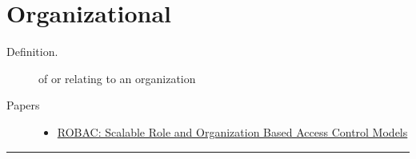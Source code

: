 \documentclass[letterpaper,10pt,english]{sphinxmanual}
\begin{document}
\chapter{Organizational}
\label{categories/organizational:organizational}\label{categories/organizational::doc}\begin{description}
\item[{Definition.}] \leavevmode
of or relating to an organization

\item[{Papers}] \leavevmode\begin{itemize}
\item {} 
\href{http://ieeexplore.ieee.org/xpls/abs\_all.jsp?arnumber=4207551}{ROBAC: Scalable Role and Organization Based Access Control Models}

\end{itemize}

\end{description}


\bigskip\hrule{}\bigskip
\end{document}
